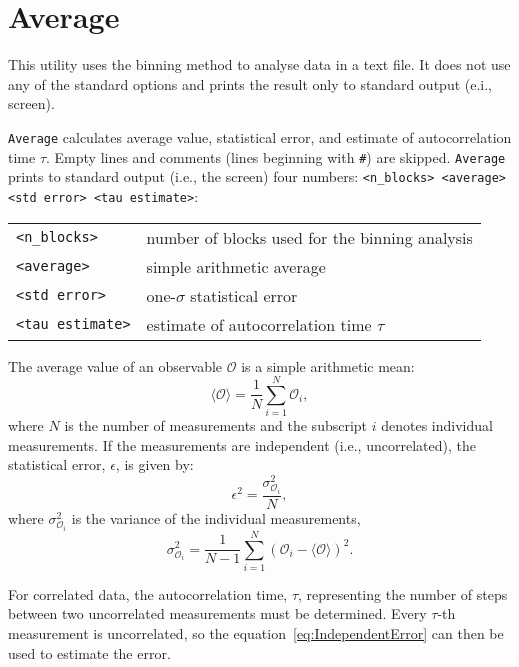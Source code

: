 \section{Average} \label{sec:Average}

This utility uses the binning method to analyse data in a text file. It
does not use any of the standard options and prints the result only to
standard output (e.i., screen).

\texttt{Average} calculates average value, statistical error, and estimate of
autocorrelation time $\tau$. Empty lines and comments (lines beginning with
\texttt{\#}) are skipped. \texttt{Average} prints to standard output (i.e.,
the screen) four numbers: \texttt{<n\_blocks> <average> <std error> <tau
estimate>}:
\begin{longtable}{ll}
  \toprule
  \texttt{<n\_blocks>} & number of blocks used for the binning analysis \\
  \texttt{<average>} & simple arithmetic average \\
  \texttt{<std error>} & one-$\sigma$ statistical error \\
  \texttt{<tau estimate>} & estimate of autocorrelation time $\tau$ \\
  \bottomrule
\end{longtable}

The average value of an observable $\mathcal{O}$ is a simple arithmetic
mean:
\begin{equation} \label{eq:Average} %
  \langle\mathcal{O}\rangle = \frac{1}{N} \sum^N_{i=1} \mathcal{O}_i,
\end{equation} %
where $N$ is the number of measurements and the subscript $i$ denotes
individual measurements. If the measurements are independent (i.e.,
uncorrelated), the statistical error, $\epsilon$, is given by:
\begin{equation} \label{eq:IndependentError} %
  \epsilon^2 =
    \frac{\sigma^2_{\mathcal{O}_i}}{N},
\end{equation} %
where $\sigma^2_{\mathcal{O}_i}$
is the variance of the individual
measurements,
\begin{equation} %
  \sigma^2_{\mathcal{O}_i} = \frac{1}{N-1} \sum^N_{i=1} (\mathcal{O}_i -
  \langle\mathcal{O}\rangle)^2.
\end{equation} %

For correlated data, the autocorrelation time,
$\tau$, representing the number of steps between two uncorrelated
measurements must be determined. Every
$\tau$-th measurement is uncorrelated, so the
equation~\eqref{eq:IndependentError} can then be used to estimate the
error.

